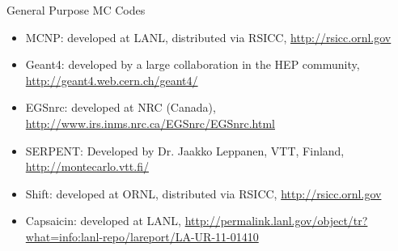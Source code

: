 \documentclass[xcolor=x11names,compress, handout]{beamer}
\renewcommand{\(}{\begin{columns}}
\renewcommand{\)}{\end{columns}}
\newcommand{\<}[1]{\begin{column}{#1}}
\renewcommand{\>}{\end{column}}
\begin{document}
\begin{frame}{General Purpose MC Codes}

\begin{itemize}
\item \alert{MCNP}: developed at LANL, distributed via RSICC, \href{http://rsicc.ornl.gov}{http://rsicc.ornl.gov}
%

\item \alert{Geant4}: developed by a large collaboration in the HEP community, \href{ http://geant4.web.cern.ch/geant4/}{http://geant4.web.cern.ch/geant4/}

\item \alert{EGSnrc}: developed at NRC (Canada), \href{http://www.irs.inms.nrc.ca/EGSnrc/EGSnrc.html}{http://www.irs.inms.nrc.ca/EGSnrc/EGSnrc.html}

\item \alert{SERPENT}: Developed by Dr. Jaakko Leppanen, VTT, Finland, \href{ http://montecarlo.vtt.fi/}{http://montecarlo.vtt.fi/}

\item \alert{Shift}: developed at ORNL, distributed via RSICC, \href{http://rsicc.ornl.gov}{http://rsicc.ornl.gov}

\item \alert{Capsaicin}: developed at LANL, \href{http://permalink.lanl.gov/object/tr?what=info:lanl-repo/lareport/LA-UR-11-01410}{http://permalink.lanl.gov/object/tr?what=info:lanl-repo/lareport/LA-UR-11-01410}

\end{itemize}

\end{frame}
\end{document}
